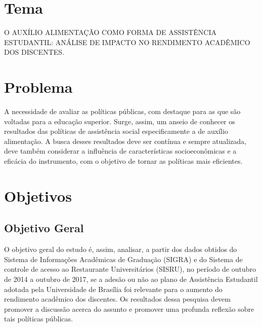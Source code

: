 \section{Tema}%
O AUXÍLIO ALIMENTAÇÃO COMO FORMA DE ASSISTÊNCIA ESTUDANTIL: ANÁLISE DE IMPACTO NO RENDIMENTO ACADÊMICO DOS DISCENTES.

\section{Problema}%
A necessidade de avaliar as políticas públicas, com destaque para as que são voltadas para a educação superior. Surge, assim, um anseio de conhecer os resultados das políticas de assistência social especificamente a de auxílio alimentação. A busca desses resultados deve ser contínua e sempre atualizada, deve também considerar a influência de características socioeconômicas e a eficácia do instrumento, com o objetivo de tornar as políticas mais eficientes.

\section{Objetivos}%

\subsection{Objetivo Geral}
O objetivo geral do estudo é, assim, analisar, a partir dos dados obtidos do Sistema de Informações Acadêmicas de Graduação (SIGRA) e do Sistema de controle de acesso ao Restaurante Universitários (SISRU), no período de outubro de 2014 a outubro de 2017, se a adesão ou não ao plano de Assistência Estudantil adotada pela Universidade de Brasília foi relevante para o aumento do rendimento acadêmico dos discentes. Os resultados dessa pesquisa devem promover a discussão acerca do assunto e promover uma profunda reflexão sobre tais políticas públicas.

